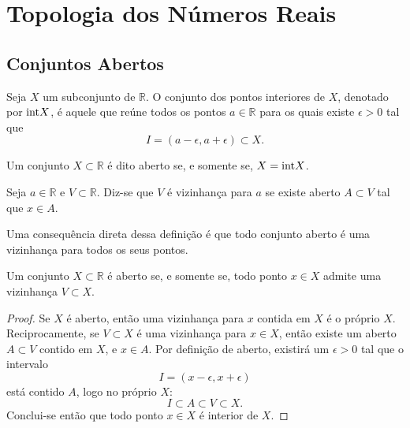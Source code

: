 \section{Topologia dos Números Reais}

\subsection{Conjuntos Abertos}

\begin{def:interior}
Seja $X$ um subconjunto de $\mathbb{R}$. O conjunto dos pontos interiores de $X$,
denotado por $\mathrm{int} X$, é aquele que reúne todos os pontos $a \in \mathbb{R}$ para
os quais existe $\epsilon > 0$ tal que
\[
	I = (a - \epsilon, a + \epsilon) \subset X.
\]
\end{def:interior}

\begin{def:aberto}
Um conjunto $X \subset \mathbb{R}$ é dito aberto se, e somente se, $X = \mathrm{int} X$.
\end{def:aberto}

\begin{def:vizinhanca}
Seja $a \in \mathbb{R}$ e $V \subset \mathbb{R}$. Diz-se que $V$ é vizinhança para
$a$ se existe aberto $A \subset V$ tal que $x \in A$.
\end{def:vizinhanca}
\noindent
Uma consequência direta dessa definição é que todo conjunto aberto é uma vizinhança para
todos os seus pontos.

\begin{prop:vizinhanca}
Um conjunto $X \subset \mathbb{R}$ é aberto se, e somente se, todo ponto $x \in X$
admite uma vizinhança $V \subset X$.
\begin{proof}
	Se $X$ é aberto, então uma vizinhança para $x$ contida em $X$ é o próprio $X$.
	Reciprocamente, se $V \subset X$ é uma vizinhança para $x \in X$, então existe
	um aberto $A \subset V$ contido em $X$, e $x \in A$. Por definição de aberto, existirá
	um $\epsilon > 0$ tal que o intervalo
	\[
		I = (x - \epsilon, x + \epsilon)
	\]
	está contido $A$, logo no próprio $X$:
	\[
		I \subset A \subset V \subset X.
	\]
	Conclui-se então que todo ponto $x \in X$ é interior de $X$.
\end{proof}
\end{prop:vizinhanca}

